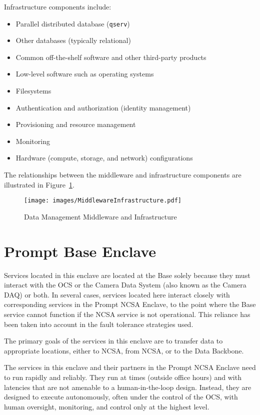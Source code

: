 \documentclass[DM,toc]{lsstdoc}
\begin{document}
Infrastructure components include:
\begin{itemize}
\item
  Parallel distributed database (\texttt{qserv})
\item
  Other databases (typically relational)
\item
  Common off-the-shelf software and other third-party products
\item
  Low-level software such as operating systems
\item
  Filesystems
\item
  Authentication and authorization (identity management)
\item
  Provisioning and resource management
\item
  Monitoring
\item
  Hardware (compute, storage, and network) configurations
\end{itemize}

The relationships between the middleware and infrastructure components
are illustrated in Figure~\ref{fig:mwandinfra}.

\begin{figure}
\centering
\texttt{[image: images/MiddlewareInfrastructure.pdf]}
\caption{Data Management Middleware and Infrastructure}
\label{fig:mwandinfra}
\end{figure}


\section{Prompt Base Enclave}\label{prompt-base-enclave}

Services located in this enclave are located at the Base solely because
they must interact with the OCS or the Camera Data System (also known as
the Camera DAQ) or both. In several cases, services located here
interact closely with corresponding services in the Prompt NCSA Enclave,
to the point where the Base service cannot function if the
NCSA service is not operational. This reliance has been taken into
account in the fault tolerance strategies used.

The primary goals of the services in this enclave are to transfer data
to appropriate locations, either to NCSA, from NCSA, or to the Data
Backbone.

The services in this enclave and their partners in the Prompt NCSA Enclave
need to run rapidly and reliably. They run at times
(outside office hours) and with latencies that are not amenable to a
human-in-the-loop design. Instead, they are designed to execute
autonomously, often under the control of the OCS, with human oversight,
monitoring, and control only at the highest level.
\end{document}
